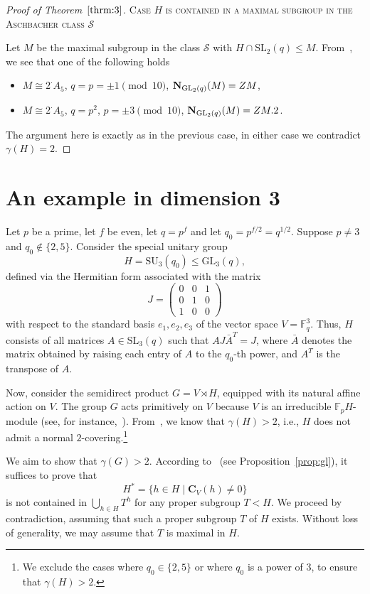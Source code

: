 \documentclass{amsart}
\begin{document}
\begin{proof}[Proof of Theorem~$\ref{thrm:3}$]
\smallskip

\noindent\textsc{Case $H$ is contained in a maximal subgroup in the Aschbacher class $\mathcal{S}$} 

\smallskip

\noindent Let $M$ be the maximal subgroup in the class $\mathcal{S}$ with $H\cap\mathrm{SL}_2(q)\le M$. From~\cite[Table~8.2]{bray}, we see that one of the following holds
\begin{itemize}
\item $M\cong 2^\cdot A_5$, $q=p=\pm 1\pmod {10}$, ${\bf N}_{\mathrm{GL}_2(q)}(M)=Z M$, 
\item $M\cong 2^\cdot A_5$, $q=p^2$, $p=\pm 3\pmod {10}$, ${\bf N}_{\mathrm{GL}_2(q)}(M)=Z M.2$.
\end{itemize}
The argument here is exactly as in the previous case, in either case we contradict $\gamma(H)=2$.
\end{proof}


\section{An example in dimension 3}\label{sec:example}Let $p$ be a prime, let $f$ be even, let $q=p^f$ and let $q_0 = p^{f/2}=q^{1/2}$. 
Suppose $p \ne 3$ and $q_0 \notin \{2,5\}$. Consider the special unitary group
\[
H = \mathrm{SU}_3(q_0) \le \mathrm{GL}_3(q),
\]
defined via the Hermitian form associated with the matrix
\[
J =
\begin{pmatrix}
0 & 0 & 1 \\
0 & 1 & 0 \\
1 & 0 & 0
\end{pmatrix}
\]
with respect to the standard basis $e_1, e_2, e_3$ of the vector space $V = \mathbb{F}_q^3$. Thus, $H$ consists of all matrices $A \in \mathrm{SL}_3(q)$ such that $A J \bar A^{T} = J$, where $\bar A$ denotes the matrix obtained by raising each entry of $A$ to the $q_0$-th power, and $A^T$ is the transpose of $A$.

Now, consider the semidirect product $G = V \rtimes H$, equipped with its natural affine action on $V$. The group $G$ acts primitively on $V$ because $V$ is an irreducible $\mathbb{F}_p H$-module (see, for instance,~\cite[Proposition~2.10.6]{kl}). From~\cite[Lemma~4.2]{libro}, we know that $\gamma(H) > 2$, i.e., $H$ does not admit a normal $2$-covering.\footnote{We exclude the cases where $q_0 \in \{2,5\}$ or where $q_0$ is a power of $3$, to ensure that $\gamma(H) > 2$.}

We aim to show that $\gamma(G) > 2$. According to~\cite[Corollary~14]{GL} (see Proposition~\ref{prop:gl}), it suffices to prove that
\[
H^\ast = \{h \in H \mid \mathbf{C}_V(h) \ne 0\}
\]
is not contained in $\bigcup_{h \in H} T^h$ for any proper subgroup $T < H$. We proceed by contradiction, assuming that such a proper subgroup $T$ of $H$ exists. Without loss of generality, we may assume that $T$ is maximal in $H$.
\end{document}

